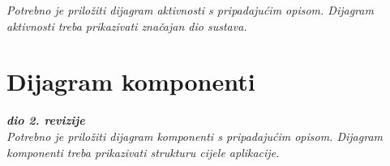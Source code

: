 			 \textit{Potrebno je priložiti dijagram aktivnosti s pripadajućim opisom. Dijagram aktivnosti treba prikazivati značajan dio sustava.}
			
			\eject
		\section{Dijagram komponenti}
		
			\textbf{\textit{dio 2. revizije}}\\
		
			 \textit{Potrebno je priložiti dijagram komponenti s pripadajućim opisom. Dijagram komponenti treba prikazivati strukturu cijele aplikacije.}